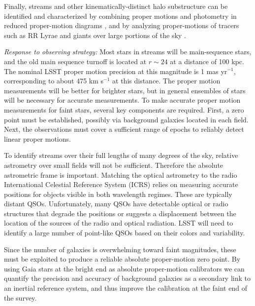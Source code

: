Finally, streams and other kinematically-distinct halo substructure
can be identified and characterized by combining proper motions and
photometry in reduced proper-motion diagrams \citep[e.g.,][]{carlin12},
and by analyzing proper-motions of tracers such as
RR Lyrae and giants over large portions of the sky \citep[e.g.,][]{casettidinescu15}.

{\it Response to observing strategy:} Most stars in streams will be main-sequence stars, and the old main sequence turnoff  is located at $r\sim24$ at a distance of 100 kpc.
The nominal LSST proper motion precision at this magnitude is 1 mas yr$^{-1}$, corresponding to about 475 km s$^{-1}$ at this distance. The proper motion
measurements will be better for brighter stars, but in general ensembles of stars will be necessary for accurate measurements. To make accurate proper motion measurements for faint stars, several key components are required. First, a zero point must be established, possibly via background galaxies located in each field. Next, the observations must cover a sufficient range of epochs to reliably detect linear proper motions.

To identify streams over their full lengths of many degrees of the sky, relative astrometry over small fields will not be sufficient. Therefore the absolute astrometric frame is important. Matching the optical astrometry to the radio International Celestial Reference System (ICRS) relies on measuring accurate positions for objects visible in both wavelength regimes.
These are typically distant QSOs. Unfortunately, many QSOs have detectable optical or radio structures that degrade the positions or suggests a displacement between the location of the sources of the radio and optical radiation. LSST will need to identify a large number of point-like QSOs based on their colors and variability.

Since the number of galaxies is overwhelming toward faint magnitudes,
these must be exploited to produce a reliable absolute
proper-motion zero point. By using Gaia stars at the bright end
as absolute proper-motion calibrators we can quantify the precision
and accuracy of background galaxies as a secondary link to an inertial reference system, and thus improve the calibration at the faint end of the survey.


